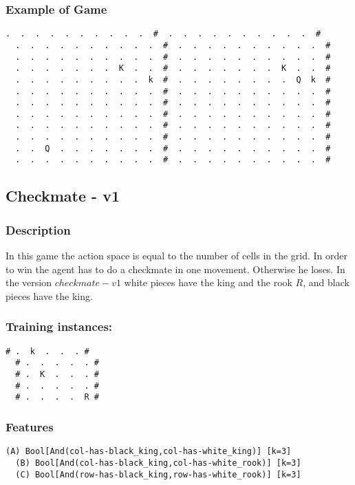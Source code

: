 \documentclass[a4paper]{article}
\begin{document}
\subsubsection{Example of Game}
\begin{Verbatim}[fontsize=\footnotesize]
  .  .  .  .  .  .  .  .  .  .  #  .  .  .  .  .  .  .  .  .  .  #
  .  .  .  .  .  .  .  .  .  .  #  .  .  .  .  .  .  .  .  .  .  #
  .  .  .  .  .  .  .  .  .  .  #  .  .  .  .  .  .  .  .  .  .  #
  .  .  .  .  .  .  .  K  .  .  #  .  .  .  .  .  .  .  K  .  .  #
  .  .  .  .  .  .  .  .  .  k  #  .  .  .  .  .  .  .  .  Q  k  #
  .  .  .  .  .  .  .  .  .  .  #  .  .  .  .  .  .  .  .  .  .  #
  .  .  .  .  .  .  .  .  .  .  #  .  .  .  .  .  .  .  .  .  .  #
  .  .  .  .  .  .  .  .  .  .  #  .  .  .  .  .  .  .  .  .  .  #
  .  .  .  .  .  .  .  .  .  .  #  .  .  .  .  .  .  .  .  .  .  #
  .  .  .  .  .  .  .  .  .  .  #  .  .  .  .  .  .  .  .  .  .  #
  .  .  Q  .  .  .  .  .  .  .  #  .  .  .  .  .  .  .  .  .  .  #
  .  .  .  .  .  .  .  .  .  .  #  .  .  .  .  .  .  .  .  .  .  #
\end{Verbatim}

\subsection{Checkmate - v1}
\subsubsection{Description}
In this game the action space is equal to the number of cells in the grid. In order to win the agent has to do a checkmate in one movement. Otherwise he loses. In the version $checkmate-v1$ white pieces have the king and the rook $R$, and black pieces have the king.

\subsubsection{Training instances:}
\begin{Verbatim}[fontsize=\footnotesize]
  # .  k  .  .  . #
  # .  .  .  .  . #
  # .  K  .  .  . #
  # .  .  .  .  . #
  # .  .  .  .  R #
\end{Verbatim}

\subsubsection{Features}
\begin{Verbatim}[fontsize=\footnotesize]
  (A) Bool[And(col-has-black_king,col-has-white_king)] [k=3]
  (B) Bool[And(col-has-black_king,col-has-white_rook)] [k=3]
  (C) Bool[And(row-has-black_king,row-has-white_rook)] [k=3]

\end{Verbatim}
\end{document}
